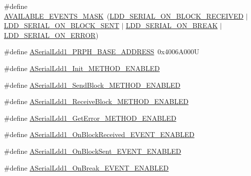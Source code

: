 \begin{DoxyCompactItemize}
\item 
\#define \hyperlink{group___a_serial_ldd1__module_ga5f04a8830cd52a3ffa1678d113f31aee}{A\-V\-A\-I\-L\-A\-B\-L\-E\-\_\-\-E\-V\-E\-N\-T\-S\-\_\-\-M\-A\-S\-K}~(\hyperlink{group___p_e___types__module_ga1bdfbf78e53d634c2d6c0fac21346a9d}{L\-D\-D\-\_\-\-S\-E\-R\-I\-A\-L\-\_\-\-O\-N\-\_\-\-B\-L\-O\-C\-K\-\_\-\-R\-E\-C\-E\-I\-V\-E\-D} $|$ \hyperlink{group___p_e___types__module_gab32dd0cda62049bd256c1b13d6848ebd}{L\-D\-D\-\_\-\-S\-E\-R\-I\-A\-L\-\_\-\-O\-N\-\_\-\-B\-L\-O\-C\-K\-\_\-\-S\-E\-N\-T} $|$ \hyperlink{group___p_e___types__module_ga5791992a91907e5233a850cd45ea8c21}{L\-D\-D\-\_\-\-S\-E\-R\-I\-A\-L\-\_\-\-O\-N\-\_\-\-B\-R\-E\-A\-K} $|$ \hyperlink{group___p_e___types__module_ga22530c977497afda0f11c86bbf869550}{L\-D\-D\-\_\-\-S\-E\-R\-I\-A\-L\-\_\-\-O\-N\-\_\-\-E\-R\-R\-O\-R})
\item 
\#define \hyperlink{group___a_serial_ldd1__module_gad9f8e308ce0b459724fa9063778226f3}{A\-Serial\-Ldd1\-\_\-\-P\-R\-P\-H\-\_\-\-B\-A\-S\-E\-\_\-\-A\-D\-D\-R\-E\-S\-S}~0x4006\-A000\-U
\item 
\#define \hyperlink{group___a_serial_ldd1__module_ga84f54fa4124bc3dd49cf50bcc270179e}{A\-Serial\-Ldd1\-\_\-\-Init\-\_\-\-M\-E\-T\-H\-O\-D\-\_\-\-E\-N\-A\-B\-L\-E\-D}
\item 
\#define \hyperlink{group___a_serial_ldd1__module_ga509640fb9027c94e88c56ac41d695f7b}{A\-Serial\-Ldd1\-\_\-\-Send\-Block\-\_\-\-M\-E\-T\-H\-O\-D\-\_\-\-E\-N\-A\-B\-L\-E\-D}
\item 
\#define \hyperlink{group___a_serial_ldd1__module_ga1aee05f3a9c0f5ae70acda61f9168dec}{A\-Serial\-Ldd1\-\_\-\-Receive\-Block\-\_\-\-M\-E\-T\-H\-O\-D\-\_\-\-E\-N\-A\-B\-L\-E\-D}
\item 
\#define \hyperlink{group___a_serial_ldd1__module_gab680be05b2b7c712d928dbd5714e76f3}{A\-Serial\-Ldd1\-\_\-\-Get\-Error\-\_\-\-M\-E\-T\-H\-O\-D\-\_\-\-E\-N\-A\-B\-L\-E\-D}
\item 
\#define \hyperlink{group___a_serial_ldd1__module_ga72f80f8a03f6e282f98fa48bbace1b26}{A\-Serial\-Ldd1\-\_\-\-On\-Block\-Received\-\_\-\-E\-V\-E\-N\-T\-\_\-\-E\-N\-A\-B\-L\-E\-D}
\item 
\#define \hyperlink{group___a_serial_ldd1__module_gaa7051315c6d66d9dad5981181abbbb2a}{A\-Serial\-Ldd1\-\_\-\-On\-Block\-Sent\-\_\-\-E\-V\-E\-N\-T\-\_\-\-E\-N\-A\-B\-L\-E\-D}
\item 
\#define \hyperlink{group___a_serial_ldd1__module_gaa1fbbf5b726d5b064e6f772a364572c8}{A\-Serial\-Ldd1\-\_\-\-On\-Break\-\_\-\-E\-V\-E\-N\-T\-\_\-\-E\-N\-A\-B\-L\-E\-D}

\end{DoxyCompactItemize}
